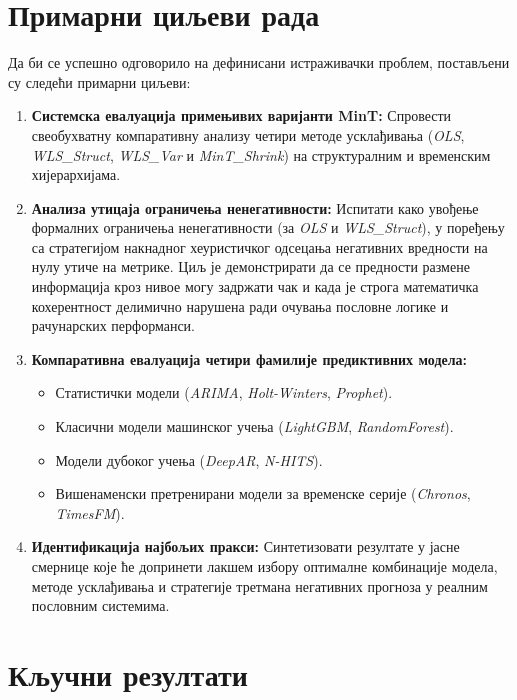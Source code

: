 \documentclass[12pt,oneside]{memoir}
\begin{document}
\section{Примарни циљеви рада}

Да би се успешно одговорило на дефинисани истраживачки проблем, постављени су следећи примарни циљеви:

\begin{enumerate}
 \item \textbf{Системска евалуација примењивих варијанти MinT:} Спровести свеобухватну компаративну анализу четири методе усклађивања (\textit{OLS}, \textit{WLS\_Struct}, \textit{WLS\_Var} и \textit{MinT\_Shrink}) на структуралним и временским хијерархијама.
    
  \item \textbf{Анализа утицаја ограничења ненегативности:} Испитати како увођење формалних ограничења ненегативности (за \textit{OLS} и \textit{WLS\_Struct}), у поређењу са стратегијом накнадног хеуристичког одсецања негативних вредности на нулу утиче на метрике. Циљ је демонстрирати да се предности размене информација кроз нивое могу задржати чак и када је строга математичка кохерентност делимично нарушена ради очувања пословне логике и рачунарских перформанси.
    
\item \textbf{Компаративна евалуација четири фамилије предиктивних модела:} 
    \begin{itemize}
        \item Статистички модели (\textit{ARIMA}, \textit{Holt-Winters}, \textit{Prophet}).
        \item Класични модели машинског учења (\textit{LightGBM}, \textit{RandomForest}).
        \item Модели дубоког учења (\textit{DeepAR}, \textit{N-HITS}).
        \item Вишенаменски претренирани модели за временске серије (\textit{Chronos}, \textit{TimesFM}).
    \end{itemize}
    
 \item \textbf{Идентификација најбољих пракси:} Синтетизовати резултате у јасне смернице које ће допринети лакшем избору оптималне комбинације модела, методе усклађивања и стратегије третмана негативних прогноза у реалним пословним системима.
\end{enumerate}

\section{Кључни резултати}
\end{document}
